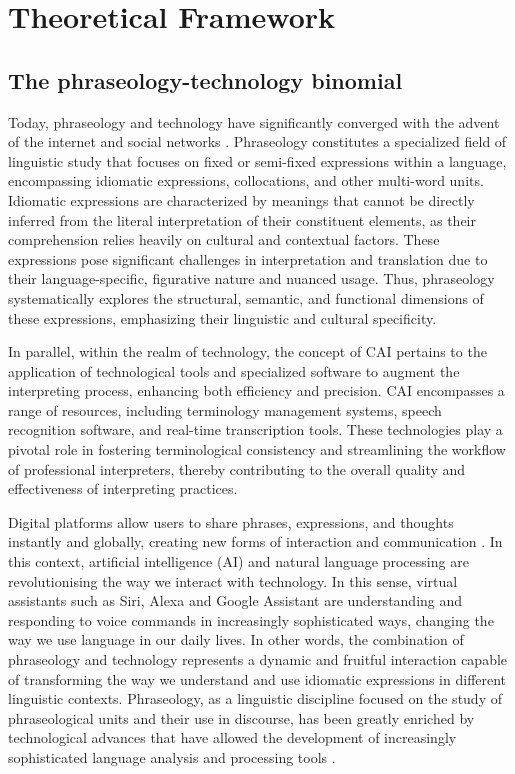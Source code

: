 \section{Theoretical Framework}\label{sec-theoretical}
\subsection{The phraseology-technology binomial}\label{sub-sec-thephraseologytechnology}

Today, phraseology and technology have significantly converged with the
advent of the internet and social networks \cite{corpas2013}.
Phraseology constitutes a specialized field of linguistic study that
focuses on fixed or semi-fixed expressions within a language,
encompassing idiomatic expressions, collocations, and other multi-word
units. Idiomatic expressions are characterized by meanings that cannot
be directly inferred from the literal interpretation of their
constituent elements, as their comprehension relies heavily on cultural
and contextual factors. These expressions pose significant challenges in
interpretation and translation due to their language-specific,
figurative nature and nuanced usage. Thus, phraseology systematically
explores the structural, semantic, and functional dimensions of these
expressions, emphasizing their linguistic and cultural specificity.

In parallel, within the realm of technology, the concept of CAI pertains
to the application of technological tools and specialized software to
augment the interpreting process, enhancing both efficiency and
precision. CAI encompasses a range of resources, including terminology
management systems, speech recognition software, and real-time
transcription tools. These technologies play a pivotal role in fostering
terminological consistency and streamlining the workflow of professional
interpreters, thereby contributing to the overall quality and
effectiveness of interpreting practices.

Digital platforms allow users to share phrases, expressions, and
thoughts instantly and globally, creating new forms of interaction and
communication \cite{piccioni2017}. In this context,
artificial intelligence (AI) and natural language processing are
revolutionising the way we interact with technology. In this sense,
virtual assistants such as Siri, Alexa and Google Assistant are
understanding and responding to voice commands in increasingly
sophisticated ways, changing the way we use language in our daily lives.
In other words, the combination of phraseology and technology represents
a dynamic and fruitful interaction capable of transforming the way we
understand and use idiomatic expressions in different linguistic
contexts. Phraseology, as a linguistic discipline focused on the study
of phraseological units and their use in discourse, has been greatly
enriched by technological advances that have allowed the development of
increasingly sophisticated language analysis and processing tools
\cite{sarachoArnaiz2015}.

